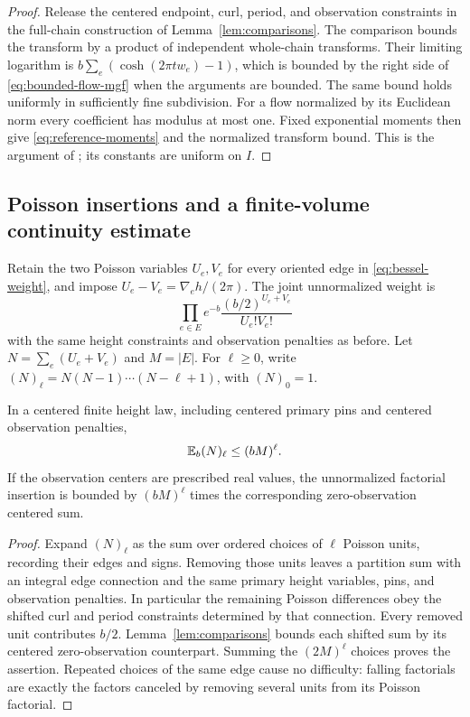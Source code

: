 \begin{proof}
Release the centered endpoint, curl, period, and observation constraints
in the full-chain construction of Lemma~\ref{lem:comparisons}.  The
comparison bounds the transform by a product of independent whole-chain
transforms.  Their limiting logarithm is
$b\sum_e(\cosh(2\pi tw_e)-1)$, which is bounded by the right side of
\eqref{eq:bounded-flow-mgf} when the arguments are bounded.  The same
bound holds uniformly in sufficiently fine subdivision.  For a flow
normalized by its Euclidean norm every coefficient has modulus at most
one.  Fixed exponential moments then give \eqref{eq:reference-moments}
and the normalized transform bound.  This is the argument of
\cite[Lemma~2.3]{X}; its constants are uniform on $I$.
\end{proof}

\subsection{Poisson insertions and a finite-volume continuity estimate}

Retain the two Poisson variables $U_e,V_e$ for every oriented edge in
\eqref{eq:bessel-weight}, and impose
$U_e-V_e=\nabla_eh/(2\pi)$.  The joint unnormalized weight is
\[
 \prod_{e\in E}e^{-b}\frac{(b/2)^{U_e+V_e}}{U_e!V_e!}
\]
with the same height constraints and observation penalties as before.
Let $N=\sum_e(U_e+V_e)$ and $M=|E|$.  For $\ell\ge0$, write
$(N)_\ell=N(N-1)\cdots(N-\ell+1)$, with $(N)_0=1$.

\begin{lemma}\label{lem:factorial}
In a centered finite height law, including centered primary pins and
centered observation penalties,
\begin{equation}\label{eq:factorial-bound}
                         \mathbb E_b(N)_\ell\le(bM)^\ell.
\end{equation}
If the observation centers are prescribed real values, the unnormalized
factorial insertion is bounded by $(bM)^\ell$ times the corresponding
zero-observation centered sum.
\end{lemma}

\begin{proof}
Expand $(N)_\ell$ as the sum over ordered choices of $\ell$ Poisson
units, recording their edges and signs.  Removing those units leaves a
partition sum with an integral edge connection and the same primary
height variables, pins, and observation penalties.  In particular the
remaining Poisson differences obey the shifted curl and period
constraints determined by that connection.  Every removed unit
contributes $b/2$.  Lemma~\ref{lem:comparisons} bounds each shifted sum
by its centered zero-observation counterpart.  Summing the $(2M)^\ell$
choices proves the assertion.  Repeated choices of the same edge cause
no difficulty: falling factorials are exactly the factors canceled by
removing several units from its Poisson factorial.
\end{proof}

